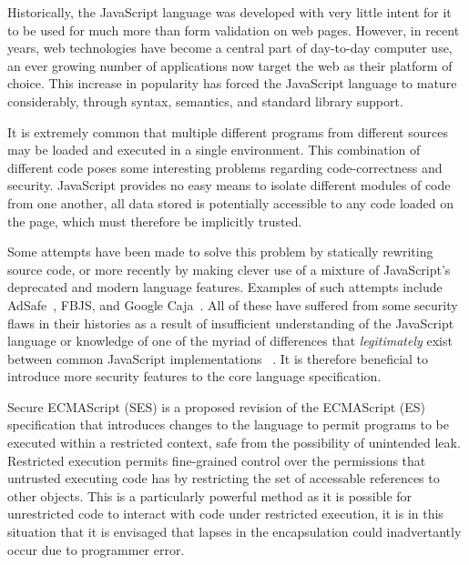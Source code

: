 \documentclass[a4paper,notitlepage]{report}
\begin{document}

  Historically, the JavaScript language was developed with very little intent
  for it to be used for much more than form validation on web pages.
  However, in recent years, web technologies have become a central part of
  day-to-day computer use, an ever growing number of applications now target the
  web as their platform of choice.
  This increase in popularity has forced the JavaScript language to mature
  considerably, through syntax, semantics, and standard library support.

  It is extremely common
  that multiple different programs from different sources may be loaded and
  executed in a single environment. This combination of different code poses
  some interesting problems regarding code-correctness and security. JavaScript
  provides no easy means to isolate different modules of code from one another,
  all data stored is potentially accessible to any code loaded on the page,
  which must therefore be implicitly trusted.

  Some attempts have been made to solve this problem by statically rewriting
  source code, or more recently by making clever use of
  a mixture of JavaScript's deprecated and modern language features.
  Examples of such attempts include AdSafe~\cite{AdSafe}, FBJS, and
  Google Caja~\cite{miller2008caja}.
  All of these have suffered from some security
  flaws in their histories as a
  result of insufficient understanding of the JavaScript language or knowledge
  of one of the myriad of differences that \emph{legitimately} exist between
  common JavaScript implementations~
  \cite{maffeis2009jsisolation, maffeis2010object-cap, ses-semantics}.
  It is therefore beneficial to introduce more security features to the core
  language specification.

  Secure ECMAScript (SES) is a proposed revision of the ECMAScript (ES)
  specification that introduces changes to the language to permit programs to be
  executed within a restricted context, safe from the possibility of unintended
  leak.
  Restricted execution permits fine-grained control over the permissions that
  untrusted executing code has by restricting the set of accessable references
  to other objects.
  This is a particularly powerful method as it is possible for unrestricted code
  to interact with code under restricted execution, it is in this situation that
  it is envisaged that lapses in the encapsulation could inadvertantly occur due
  to programmer error.
\end{document}
